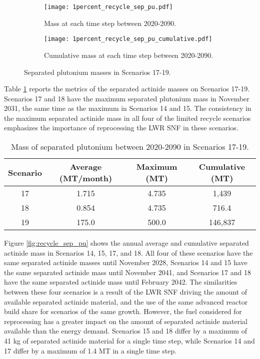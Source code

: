 \begin{figure}[h!]
    \centering
    \begin{subfigure}[b]{0.49\textwidth}
        \centering
        \texttt{[image: 1percent\_recycle\_sep\_pu.pdf]}
        \caption{Mass 
        at each time step between 2020-2090.}
        \label{fig:1percent_recycle_sep_pu_all}
    \end{subfigure}
    \hfill
    \begin{subfigure}[b]{0.49\textwidth}
        \centering
        \texttt{[image: 1percent\_recycle\_sep\_pu\_cumulative.pdf]}
        \caption{Cumulative mass 
        at each time step between 2020-2090.}
        \label{fig:1percent_recycle_sep_pu_cumulative}
    \end{subfigure}
       \caption{Separated plutonium masses in Scenarios 17-19.}
       \label{fig:1percent_recycle_sep_pu}
\end{figure}

Table \ref{tab:s17-19_sep_pu} reports the metrics of the separated 
actinide masses on Scenarios 17-19. Scenarios 17 and 18 have the 
maximum separated plutonium mass in November 2031, the same time 
as the maximum in Scenarios 14 and 15. The consistency in the 
maximum separated actinide mass in all four of the limited 
recycle scenarios emphasizes the importance of reprocessing the 
\gls{LWR} \gls{SNF} in these scenarios. 

\begin{table}[h!]
    \centering 
    \caption{Mass of separated plutonium between 2020-2090 in Scenarios 
    17-19.}
    \label{tab:s17-19_sep_pu}
    \begin{tabular}{c c c c}
        \hline 
        Scenario & Average (MT/month) & Maximum (MT) & Cumulative (MT) \\
        \hline
        17 & 1.715 & 4.735 & 1,439\\
        18 & 0.854 & 4.735 & 716.4\\
        19 & 175.0 & 500.0 & 146,837\\
        \hline
    \end{tabular}
\end{table}

Figure 
\ref{fig:recycle_sep_pu} shows the annual average and cumulative 
separated actinide mass in Scenarios 14, 15, 17, and 18. All four of 
these scenarios have the same separated actinide masses until 
November 2028, Scenarios 14 and 15 have the same separated actinide 
mass until November 2041, and Scenarios 17 and 18 have the same separated 
actinide mass until February 2042. The similarities between these four 
scenarios is a result of the \gls{LWR} \gls{SNF} driving the amount 
of available separated actinide material, and the use of the 
same advanced reactor build share for scenarios of the same growth. 
However, the fuel considered for reprocessing has a greater impact 
on the amount of separated actinide material available than the 
energy demand. Scenarios 15 and 18 differ by a maximum of 41 kg of 
separated actinide material for a single time step, while Scenarios 
14 and 17 differ by a maximum of 1.4 MT in a single time step. 

